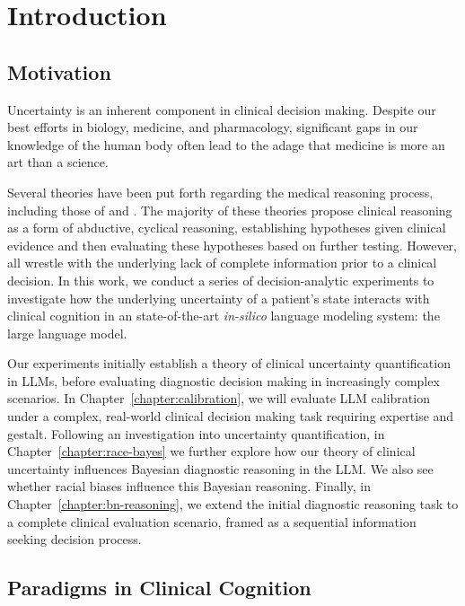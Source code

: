 \chapter{Introduction} \label{chapter:intro}

\section{Motivation}

Uncertainty is an inherent component in clinical decision making. Despite our best efforts in biology, medicine, and pharmacology, significant gaps in our knowledge of the human body often lead to the adage that medicine is more an art than a science. 

Several theories have been put forth regarding the medical reasoning process, including those of \citet{blois1984information} and \citet{paukerThresholdApproachClinical1980}. The majority of these theories propose clinical reasoning as a form of abductive, cyclical reasoning, establishing hypotheses given clinical evidence and then evaluating these hypotheses based on further testing. However, all wrestle with the underlying lack of complete information prior to a clinical decision. In this work, we conduct a series of decision-analytic experiments to investigate how the underlying uncertainty of a patient's state interacts with clinical cognition in an state-of-the-art \textit{in-silico} language modeling system: the large language model. 

Our experiments initially establish a theory of clinical uncertainty quantification in LLMs, before evaluating diagnostic decision making in increasingly complex scenarios. In Chapter~\ref{chapter:calibration}, we will evaluate LLM calibration under a complex, real-world clinical decision making task requiring expertise and gestalt. Following an investigation into uncertainty quantification, in Chapter~\ref{chapter:race-bayes} we further explore how our theory of clinical uncertainty influences Bayesian diagnostic reasoning in the LLM. We also see whether racial biases influence this Bayesian reasoning. Finally, in Chapter~\ref{chapter:bn-reasoning}, we extend the initial diagnostic reasoning task to a complete clinical evaluation scenario, framed as a sequential information seeking decision process.

\section{Paradigms in Clinical Cognition}

